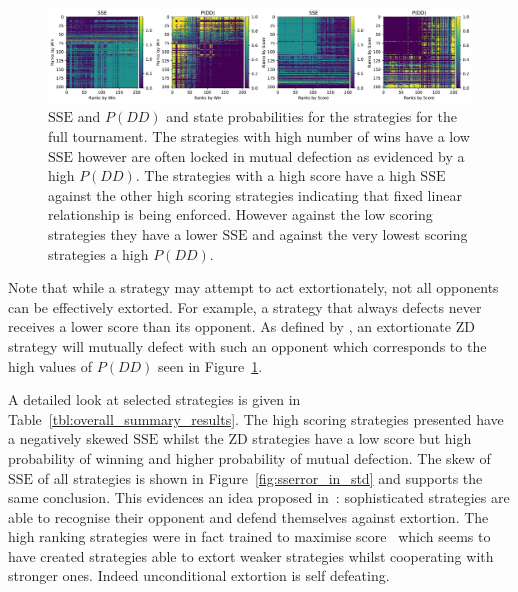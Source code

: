 \documentclass[a4paper]{article}
\newcommand{\SSe}{\text{SSE}}
\begin{document}
\begin{figure}[!htbp]
    \centering
    \includegraphics[width=.95\textwidth]{./assets/img/sse_chi_probabilities_in_full/main.pdf}
    \caption{\(\SSe\) and \(P(DD)\) and state probabilities for the strategies for
        the full tournament. The strategies with high number of wins
        have a low \(\SSe\) however are often locked in mutual defection as
        evidenced by a high \(P(DD)\). The strategies with a high score
        have a high \(\SSe\) against the other high scoring strategies
        indicating that fixed linear relationship is being enforced. However
        against the low scoring strategies they have a lower \(\SSe\) and
        against the very lowest scoring strategies a high \(P(DD)\).}
    \label{fig:sse_chi_probabilities_in_full}
\end{figure}

Note that while a strategy may attempt to act extortionately, not all opponents
can be effectively extorted. For example, a strategy that always defects never
receives a lower score than its opponent. As defined by \cite{Press2012}, an
extortionate ZD strategy will mutually defect with such an opponent which
corresponds to the high values of \(P(DD)\) seen in
Figure~\ref{fig:sse_chi_probabilities_in_full}.

A detailed look at selected strategies is given in
Table~\ref{tbl:overall_summary_results}. The high scoring strategies presented
have a negatively skewed \(\SSe\) whilst the ZD strategies have a low score but
high probability of winning and higher probability of mutual defection.
The skew of \(\SSe\) of all strategies is shown in
Figure~\ref{fig:sserror_in_std} and supports the
same conclusion. This evidences an idea proposed
in~\cite{adami2013evolutionary}: sophisticated strategies are able to recognise
their opponent and defend themselves against extortion.  The high ranking
strategies were in fact trained to maximise score~\cite{Harper2017} which seems
to have created strategies able to extort weaker strategies whilst cooperating
with stronger ones. Indeed unconditional extortion is self defeating.
\end{document}
